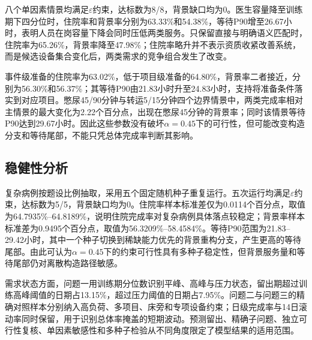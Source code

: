 八个单因素情景均满足$\varepsilon$约束，达标数为8/8，背景缺口均为0。医生容量降至训练期下四分位时，住院率和背景率分别为63.33\%和54.38\%，等待P90增至26.67小时，表明人员在岗容量下降会同时压低两类服务。只保留直接与明确语义匹配时，住院率为65.26\%，背景率降至47.98\%；住院率略升并不表示资质收紧改善系统，而是候选设备集合变化后，两类需求的竞争组合发生了改变。

事件级准备的住院率为63.02\%，低于项目级准备的64.80\%，背景率二者接近，分别为56.30\%和56.37\%；其等待P90由21.83小时升至24.83小时，支持将准备条件落实到对应项目。憋尿45/90分钟与转运5/15分钟四个边界情景中，两类完成率相对主情景的最大变化为2.22个百分点，出现在憋尿45分钟的背景率；同时该情景等待P90达到29.67小时。因此这些参数没有破坏$\alpha=0.45$下的可行性，但可能改变构造分支和等待尾部，不能只凭总体完成率判断其影响。

\subsection{稳健性分析}

复杂病例按题设比例抽取，采用五个固定随机种子重复运行。五次运行均满足$\varepsilon$约束，达标数为5/5，背景缺口均为0。住院率样本标准差仅为0.0114个百分点，取值为64.7935\%--64.8189\%，说明住院完成率对复杂病例具体落点较稳定；背景率样本标准差为0.9495个百分点，取值为56.3209\%--58.4584\%。等待P90范围为21.83--29.42小时，其中一个种子切换到稀缺能力优先的背景重构分支，产生更高的等待尾部。由此可认为$\alpha=0.45$下的约束可行性具有多种子稳定性，但背景服务量和等待尾部仍对离散构造路径敏感。

\begin{table}[H]
\centering
\caption{复杂病例多随机种子稳健性}
\label{tab:seed-robustness}

\end{table}

需求状态方面，问题一用训练期分位数识别平峰、高峰与压力状态，留出期超过训练高峰阈值的日期占13.15\%，超过压力阈值的日期占7.95\%。问题二与问题三的精确对照样本分别纳入高负荷、多项目、床旁和专项设备约束；日级完成率与14日滚动率同时保留，用于识别总体率掩盖的短期波动。预测留出、精确子问题、独立可行性复核、单因素敏感性和多种子检验从不同角度限定了模型结果的适用范围。
